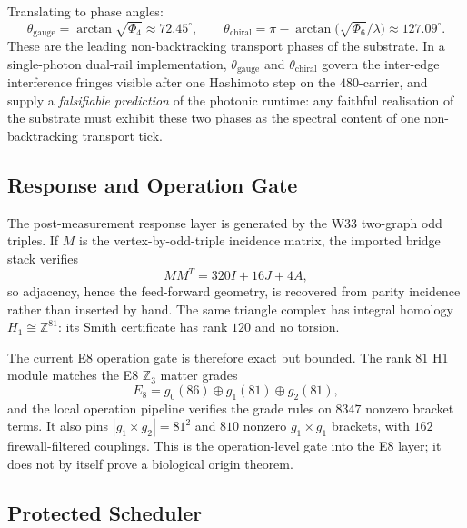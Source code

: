 ﻿\documentclass[12pt]{article}
\begin{document}
Translating to phase angles:
\begin{equation}
\theta_{\mathrm{gauge}} = \arctan\!\sqrt{\Phi_4} \approx 72.45^\circ,
\qquad
\theta_{\mathrm{chiral}} = \pi - \arctan\!\bigl(\sqrt{\Phi_6}/\lambda\bigr)
                        \approx 127.09^\circ.
\end{equation}
These are the leading non-backtracking transport phases of the substrate.
In a single-photon dual-rail implementation, $\theta_{\mathrm{gauge}}$
and $\theta_{\mathrm{chiral}}$ govern the inter-edge interference fringes
visible after one Hashimoto step on the $480$-carrier, and supply a
\emph{falsifiable prediction} of the photonic runtime: any faithful
realisation of the substrate must exhibit these two phases as the
spectral content of one non-backtracking transport tick.


\subsection{Response and Operation Gate}

The post-measurement response layer is generated by the W33 two-graph odd triples.
If $M$ is the vertex-by-odd-triple incidence matrix, the imported bridge stack
verifies
\[
MM^{T}=320I+16J+4A,
\]
so adjacency, hence the feed-forward geometry, is recovered from parity incidence
rather than inserted by hand.  The same triangle complex has integral homology
$H_1\cong \mathbb{Z}^{81}$: its Smith certificate has rank $120$ and no torsion.

The current E8 operation gate is therefore exact but bounded.  The rank $81$ H1
module matches the E8 $\mathbb{Z}_3$ matter grades
\[
E_8=g_0(86)\oplus g_1(81)\oplus g_2(81),
\]
and the local operation pipeline verifies the grade rules on $8347$ nonzero bracket
terms.  It also pins $|g_1\times g_2|=81^2$ and $810$ nonzero $g_1\times g_1$
brackets, with $162$ firewall-filtered couplings.  This is the operation-level
gate into the E8 layer; it does not by itself prove a biological origin theorem.

\subsection{Protected Scheduler}
\end{document}
